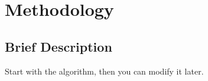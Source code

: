 \section{Methodology}

\subsection{Brief Description}

Start with the algorithm, then you can modify it later.

\vspace*{6mm}  

